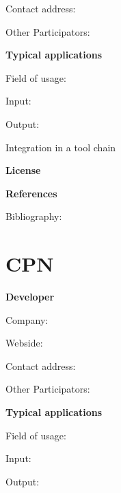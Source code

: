 \documentclass{./template/openetcs2}
\begin{document}
	Contact address:

	Other  Participators:



	\textbf{Typical applications}

	Field of usage:


	Input:

	Output:





	Integration in a tool chain



	\textbf{License}


	\textbf{References}

	Bibliography:


\section{CPN}

	\textbf{Developer}

	Company: 

	Webside:

	Contact address:

	Other  Participators:



	\textbf{Typical applications}

	Field of usage:


	Input:

	Output:



\end{document}
